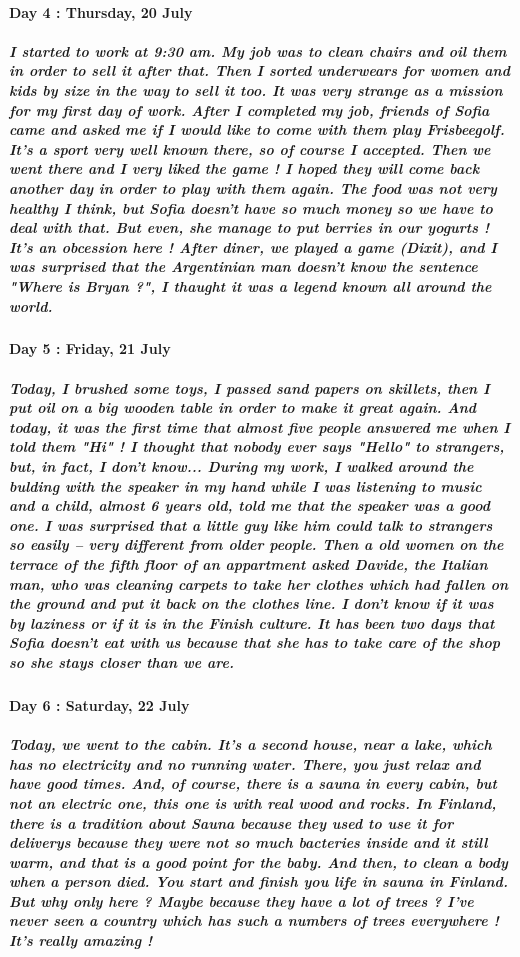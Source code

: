 \documentclass[a4paper,12pt]{report} %
\begin{document}
\paragraph{Day 4 : Thursday, 20 July}
\subparagraph{I started to work at 9:30 am. My job was to clean chairs and oil them in order to sell it after that. Then I sorted underwears for women and kids by size in the way to sell it too. It was very strange as a mission for my first day of work. After I completed my job, friends of Sofia came and asked me if I would like to come with them play Frisbeegolf. It's a sport very well known there, so of course I accepted. Then we went there and I very liked the game ! I hoped they will come back another day in order to play with them again. The food was not very healthy I think, but Sofia doesn't have so much money so we have to deal with that. But even, she manage to put berries in our yogurts ! It's an obcession here ! After diner, we played a game (Dixit), and I was surprised that the Argentinian man doesn't know the sentence "Where is Bryan ?", I thaught it was a legend known all around the world.}

\paragraph{Day 5 : Friday, 21 July}
\subparagraph{Today, I brushed some toys, I passed sand papers on skillets, then I put oil on a big wooden table in order to make it great again. And today, it was the first time that almost five people answered me when I told them "Hi" ! I thought that nobody ever says "Hello" to strangers, but, in fact, I don't know... During my work, I walked around the bulding with the speaker in my hand while I was listening to music and a child, almost 6 years old, told me that the speaker was a good one. I was surprised that a little guy like him could talk to strangers so easily -- very different from older people. Then a old women on the terrace of the fifth floor of an appartment asked Davide, the Italian man, who was cleaning carpets to take her clothes which had fallen on the ground and put it back on the clothes line. I don't know if it was by laziness or if it is in the Finish culture. It has been two days that Sofia doesn't eat with us because that she has to take care of the shop so she stays closer than we are.}

\paragraph{Day 6 : Saturday, 22 July}
\subparagraph{Today, we went to the cabin. It's a second house, near a lake, which has no electricity and no running water. There, you just relax and have good times. And, of course, there is a sauna in every cabin, but not an electric one, this one is with real wood and rocks. In Finland, there is a tradition about Sauna because they used to use it for deliverys because they were not so much bacteries inside and it still warm, and that is a good point for the baby. And then, to clean a body when a person died. You start and finish you life in sauna in Finland. But why only here ? Maybe because they have a lot of trees ? I've never seen a country which has such a numbers of trees everywhere ! It's really amazing !}
\end{document}
